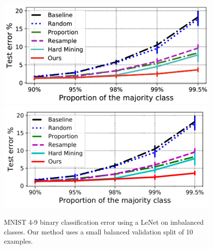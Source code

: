 
\begin{figure}
\centering
\iflatexml
\includegraphics[width=6\columnwidth]{figures/mnist-imbalance.png}
\else
\includegraphics[width=0.9\columnwidth]{figures/mnist-imbalance.pdf}
\fi
\vspace{-0.1in}
\caption{MNIST 4-9 binary classification error using a LeNet on imbalanced classes. Our method uses a small balanced validation split of 10 examples.}
\label{fig:mnist_imba}
\end{figure}
